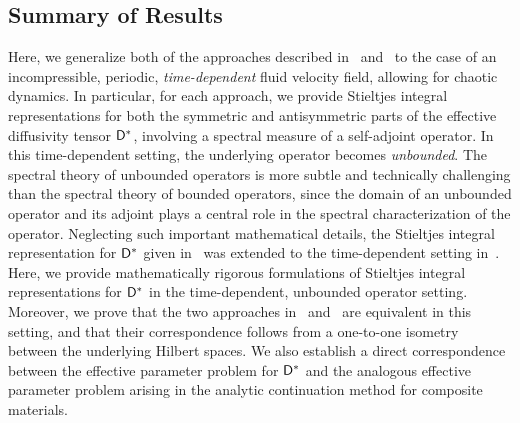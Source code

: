 \documentclass[amsa]{ipart}
\begin{document}
\subsection{Summary of Results}
%
Here, we generalize both of the approaches described
in~\cite{Avellaneda:PRL-753,Avellaneda:CMP-339}
and~\cite{Pavliotis:PHD_Thesis} to the case of an incompressible,
periodic, \emph{time-dependent} fluid velocity field, allowing for
chaotic dynamics. In particular, for each approach, we provide Stieltjes
integral representations for both the symmetric and antisymmetric
parts of the effective diffusivity tensor $\mathsf{D}^*$, involving a
spectral measure of a self-adjoint operator. In this time-dependent
setting, the underlying operator becomes \emph{unbounded}. The
spectral theory of unbounded operators is more subtle and technically
challenging than the spectral theory of bounded operators, since the
domain of an unbounded operator and its adjoint plays a central role
in the 
spectral characterization of the operator. Neglecting such important 
mathematical details, the Stieltjes integral representation for
$\mathsf{D}^*$ given in~\cite{Avellaneda:PRL-753,Avellaneda:CMP-339} was
extended to the time-dependent setting
in~\cite{Avellaneda:PRE:3249}. Here, we provide mathematically 
rigorous formulations of Stieltjes integral representations for $\mathsf{D}^*$
in the time-dependent, unbounded operator setting. Moreover, we prove
that the two approaches 
in~\cite{Avellaneda:PRL-753,Avellaneda:CMP-339}
and~\cite{Pavliotis:PHD_Thesis} are equivalent in this setting, and
that their correspondence follows from a one-to-one isometry between
the underlying Hilbert spaces. We also establish a direct
correspondence between the effective parameter problem for $\mathsf{D}^*$ and
the analogous effective parameter problem arising in the analytic
continuation method for composite materials.  
\end{document}
